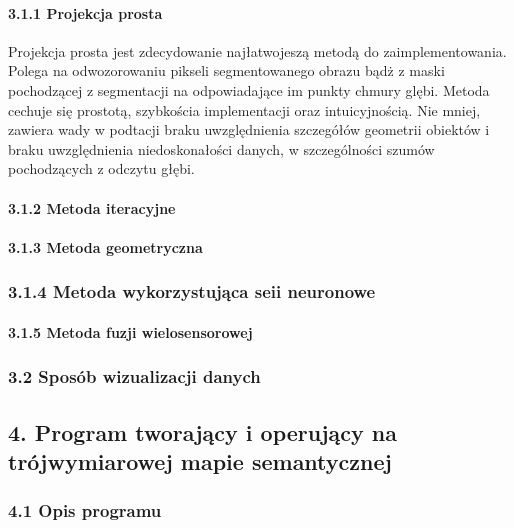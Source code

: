 \documentclass[
]{article}
\begin{document}
\paragraph{3.1.1 Projekcja prosta}\label{projekcja-prosta}

Projekcja prosta jest zdecydowanie najłatwojeszą metodą do zaimplementowania. Polega na odwozorowaniu pikseli segmentowanego obrazu bądż z maski pochodzącej z segmentacji na odpowiadające im punkty chmury glębi.
Metoda cechuje się prostotą, szybkościa implementacji oraz intuicyjnością. Nie mniej, zawiera wady w podtacji braku uwzględnienia szczegółów geometrii obiektów i braku uwzględnienia niedoskonałości danych, w szczególności szumów pochodzących z odczytu głębi.

\paragraph{3.1.2 Metoda iteracyjne}\label{metoda-iteracyjne}

\paragraph{3.1.3 Metoda geometryczna}\label{metoda-geometryczna}

\subsubsection{3.1.4 Metoda wykorzystująca seii neuronowe}\label{metoda-wykorzystujux105ca-seii-neuronowe}

\paragraph{3.1.5 Metoda fuzji wielosensorowej}\label{metoda-fuzji-wielosensorowej}

\subsubsection{3.2 Sposób wizualizacji danych}\label{sposuxf3b-wizualizacji-danych}

\subsection{4. Program tworający i operujący na trójwymiarowej mapie semantycznej}\label{program-tworajux105cy-i-operujux105cy-na-truxf3jwymiarowej-mapie-semantycznej}

\subsubsection{4.1 Opis programu}\label{opis-programu}
\end{document}
